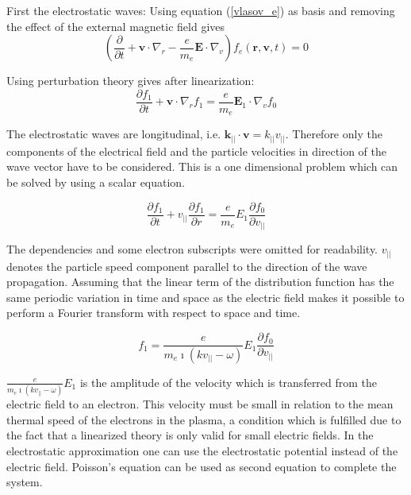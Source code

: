 \documentclass[a4paper,11pt]{thesis}
\begin{document}
First the electrostatic waves: Using equation (\ref{vlasov_e}) as basis and removing the effect of the external magnetic field gives\\

\begin{equation}\label{eq:vlasov2}
\left( \frac{\partial}{\partial t} + \mathbf{v}\cdot
\nabla_r-\frac{e}{m_e}\mathbf{E}\cdot\nabla_v \right) f_e(\mathbf{r,v},t) =0
\end{equation}

Using perturbation theory gives after linearization:\\

\begin{equation}\label{eq:vlasov_linearized}
\frac{\partial f_1}{\partial t} + \mathbf{v}\cdot
\nabla_r f_1=\frac{e}{m_e}\mathbf{E}_1\cdot\nabla_v f_0
\end{equation}

The electrostatic waves are longitudinal, i.e. $\mathbf{k}_{||}\cdot\mathbf{v}=k_{||}v_{||}$. Therefore only the components of the electrical field and
the particle velocities in direction of the wave vector have to be considered. This is a one dimensional problem which can be solved by using
a scalar equation.

\begin{equation}\label{eq:vlasov_scalar_linearized}
\frac{\partial f_1}{\partial t} + v_{||} \frac{\partial f_1}{\partial r}=\frac{e}{m_e} E_1 \frac{\partial f_0}{\partial v_{||}}
\end{equation}


The dependencies and some electron subscripts were omitted for readability. $v_{||}$ denotes the particle speed component parallel to the direction
of the wave propagation. Assuming that the linear term of the distribution function has the
same periodic variation in time and space as the electric field makes it possible to perform a Fourier transform with respect to space and
time.

\begin{equation}\label{eq:distri_func_fourier}
f_1=\frac{e}{m_e \imath (k v_{||}-\omega)}E_1 \frac{\partial f_0}{\partial v_{||}}
\end{equation}

$\frac{e}{m_e \imath (k v_{||}-\omega)}E_1$ is the amplitude of the velocity which is transferred from the electric field to an electron. This velocity must be small in relation to the mean thermal speed of the electrons in the plasma, a condition which is fulfilled due to the fact that a linearized theory is only valid for small electric fields. In the electrostatic approximation one can use the electrostatic potential instead of the electric field. Poisson's equation can be used as second equation to complete the system.\\
\end{document}

